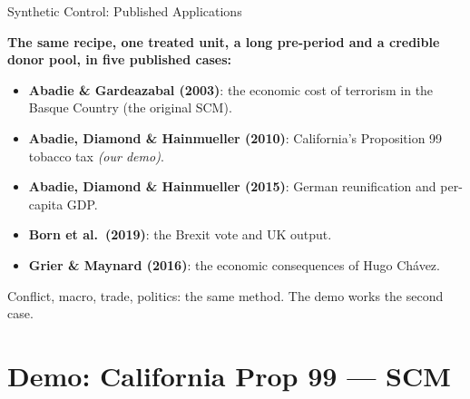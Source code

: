 \documentclass[main.tex]{subfiles}
\begin{document}
\begin{frame}{Synthetic Control: Published Applications}

  \textbf{The same recipe, one treated unit, a long pre-period and a credible
  donor pool, in five published cases:}

  \medskip
  \begin{itemize}\small
    \item \textbf{Abadie \& Gardeazabal (2003)}: the economic cost of terrorism
      in the Basque Country (the original SCM).
    \item \textbf{Abadie, Diamond \& Hainmueller (2010)}: California's
      Proposition 99 tobacco tax \emph{(our demo)}.
    \item \textbf{Abadie, Diamond \& Hainmueller (2015)}: German reunification
      and per-capita GDP.
    \item \textbf{Born et al.\ (2019)}: the Brexit vote and UK output.
    \item \textbf{Grier \& Maynard (2016)}: the economic consequences of
      Hugo Ch\'avez.
  \end{itemize}

  \medskip
  Conflict, macro, trade, politics: the same method. The demo works the
  second case.

\end{frame}

\section{Demo: California Prop 99 --- SCM}
\end{document}
